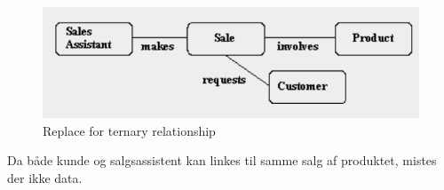 \begin{enumerate}
	\begin{figure}[H]
		\centering
		\includegraphics[width=0.7\linewidth]{figs/spm1/nonTernaryRelationPNG.PNG}
		\caption{Replace for ternary relationship}
		\label{fig:nonTernaryRelationPNG}
	\end{figure}
	
	Da både kunde og salgsassistent kan linkes til samme salg af produktet, mistes der ikke data.
\end{enumerate}
























